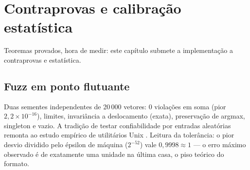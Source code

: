 \chapter{Contraprovas e calibração estatística}
Teoremas provados, hora de medir: este capítulo submete a implementação a contraprovas e estatística.
\section{Fuzz em ponto flutuante}
Duas sementes independentes de 20\,000 vetores: 0 violações em soma (pior $2{,}2\times10^{-16}$), limites, invariância a deslocamento (exata), preservação de argmax, singleton e vazio. A tradição de testar confiabilidade por entradas aleatórias remonta ao estudo empírico de utilitários Unix \cite{miller1990}. Leitura da tolerância: o pior desvio dividido pelo épsilon de máquina ($2^{-52}$) vale $0{,}9998\approx1$ --- o erro máximo observado é de exatamente uma unidade na última casa, o piso teórico do formato.
